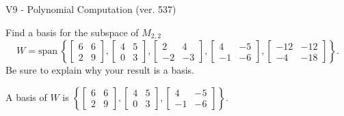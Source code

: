\begin{exercise}
  \begin{exerciseTitle}V9 - Polynomial Computation (ver. 537)\end{exerciseTitle}
  \begin{exerciseStatement}
    Find a basis for the subspace of \(M_{2,2}\) 
\[W=\mathrm{span}\ \left\{\left[\begin{array}{cc}
6 & 6 \\
2 & 9
\end{array}\right] , \left[\begin{array}{cc}
4 & 5 \\
0 & 3
\end{array}\right] , \left[\begin{array}{cc}
2 & 4 \\
-2 & -3
\end{array}\right] , \left[\begin{array}{cc}
4 & -5 \\
-1 & -6
\end{array}\right] , \left[\begin{array}{cc}
-12 & -12 \\
-4 & -18
\end{array}\right]\right\}.\]
 Be sure to explain why your result is a basis.


  \end{exerciseStatement}
  \begin{exerciseAnswer}
   A basis of \(W\) is  \(\left\{\left[\begin{array}{cc}
6 & 6 \\
2 & 9
\end{array}\right] , \left[\begin{array}{cc}
4 & 5 \\
0 & 3
\end{array}\right] , \left[\begin{array}{cc}
4 & -5 \\
-1 & -6
\end{array}\right]\right\}\).
  


  \end{exerciseAnswer}
\end{exercise}